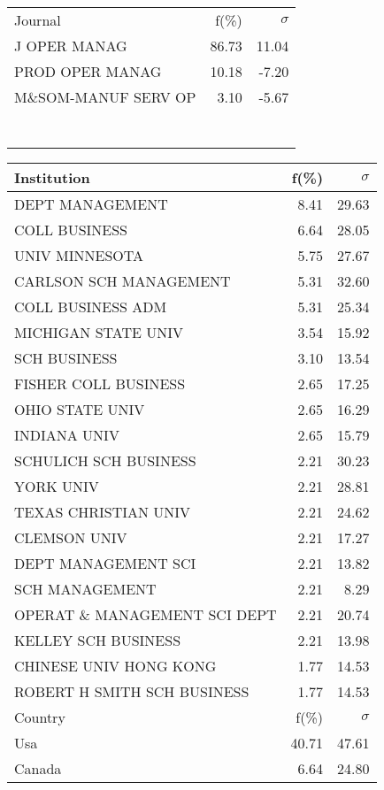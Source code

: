 \documentclass[a4paper,11pt]{report}
\begin{document}
\begin{landscape}
\begin{table}[!ht]
{\begin{tabular}{|l r  r|}
 &  & \\
\hline
\hline
Journal & f(\%) & $\sigma$\\
\hline
J OPER MANAG & 86.73 & 11.04\\
PROD OPER MANAG & 10.18 & -7.20\\
M\&SOM-MANUF SERV OP & 3.10 & -5.67\\
 &  & \\
 &  & \\
 &  & \\
 &  & \\
 &  & \\
 &  & \\
 &  & \\
\hline
\end{tabular}
}
{\scriptsize\begin{tabular}{|l r r|}
\hline
Institution & f(\%) & $\sigma$\\
\hline
DEPT MANAGEMENT & 8.41 & 29.63\\
COLL BUSINESS & 6.64 & 28.05\\
UNIV MINNESOTA & 5.75 & 27.67\\
CARLSON SCH MANAGEMENT & 5.31 & 32.60\\
COLL BUSINESS ADM & 5.31 & 25.34\\
MICHIGAN STATE UNIV & 3.54 & 15.92\\
SCH BUSINESS & 3.10 & 13.54\\
FISHER COLL BUSINESS & 2.65 & 17.25\\
OHIO STATE UNIV & 2.65 & 16.29\\
INDIANA UNIV & 2.65 & 15.79\\
SCHULICH SCH BUSINESS & 2.21 & 30.23\\
YORK UNIV & 2.21 & 28.81\\
TEXAS CHRISTIAN UNIV & 2.21 & 24.62\\
CLEMSON UNIV & 2.21 & 17.27\\
DEPT MANAGEMENT SCI & 2.21 & 13.82\\
SCH MANAGEMENT & 2.21 & 8.29\\
OPERAT \& MANAGEMENT SCI DEPT & 2.21 & 20.74\\
KELLEY SCH BUSINESS & 2.21 & 13.98\\
CHINESE UNIV HONG KONG & 1.77 & 14.53\\
ROBERT H SMITH SCH BUSINESS & 1.77 & 14.53\\
\hline
\hline
Country & f(\%) & $\sigma$\\
\hline
Usa & 40.71 & 47.61\\
Canada & 6.64 & 24.80\\

\end{tabular}}
\end{table}
\end{landscape}
\end{document}
